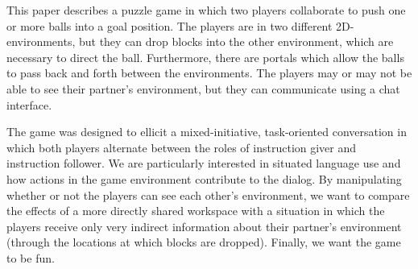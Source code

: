 This paper describes a puzzle game in which two players collaborate to
push one or more balls into a goal position. The players are in two
different 2D-environments, but they can drop blocks into the other
environment, which are necessary to direct the ball. Furthermore,
there are portals which allow the balls to pass back and forth between
the environments. The players may or may not be able to see their
partner's environment, but they can communicate using a chat
interface.

The game was designed to ellicit a mixed-initiative, task-oriented
conversation in which both players alternate between the roles of
instruction giver and instruction follower. We are particularly
interested in situated language use and how actions in the game
environment contribute to the dialog.  By manipulating whether or not
the players can see each other's environment, we want to compare the
effects of a more directly shared workspace with a situation in which
the players receive only very indirect information about their
partner's environment (through the locations at which blocks are
dropped). Finally, we want the game to be fun. 

